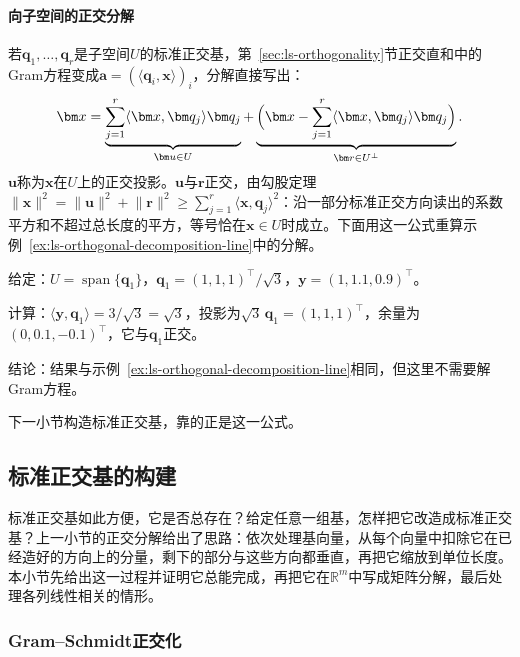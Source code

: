 \paragraph{向子空间的正交分解}
若$\bm q_1,\ldots,\bm q_r$是子空间$U$的标准正交基，第~\ref{sec:ls-orthogonality}节正交直和中的Gram方程变成$\bm a=(\langle\bm q_i,\bm x\rangle)_i$，分解直接写出：
\begin{equation}
 \bm x=\underbrace{\sum_{j=1}^r\langle\bm x,\bm q_j\rangle\bm q_j}_{\bm u\in U}+\underbrace{\Bigl(\bm x-\sum_{j=1}^r\langle\bm x,\bm q_j\rangle\bm q_j\Bigr)}_{\bm r\in U^\perp}.
 \label{eq:ls-orthonormal-projection}
\end{equation}
$\bm u$称为$\bm x$在$U$上的正交投影。$\bm u$与$\bm r$正交，由勾股定理$\lVert\bm x\rVert^2=\lVert\bm u\rVert^2+\lVert\bm r\rVert^2\geq\sum_{j=1}^r\langle\bm x,\bm q_j\rangle^2$：沿一部分标准正交方向读出的系数平方和不超过总长度的平方，等号恰在$\bm x\in U$时成立。下面用这一公式重算示例~\ref{ex:ls-orthogonal-decomposition-line}中的分解。
\begin{example}[用标准正交基重算正交分解]
\label{ex:ls-orthonormal-projection-line}
给定：$U=\operatorname{span}\{\bm q_1\}$，$\bm q_1=(1,1,1)^\top/\sqrt3$，$\bm y=(1,1.1,0.9)^\top$。

计算：$\langle\bm y,\bm q_1\rangle=3/\sqrt3=\sqrt3$，投影为$\sqrt3\,\bm q_1=(1,1,1)^\top$，余量为$(0,0.1,-0.1)^\top$，它与$\bm q_1$正交。

结论：结果与示例~\ref{ex:ls-orthogonal-decomposition-line}相同，但这里不需要解Gram方程。
\end{example}
下一小节构造标准正交基，靠的正是这一公式。

\subsection{标准正交基的构建}
\label{sec:ls-orthonormal-basis-construction}

标准正交基如此方便，它是否总存在？给定任意一组基，怎样把它改造成标准正交基？上一小节的正交分解给出了思路：依次处理基向量，从每个向量中扣除它在已经造好的方向上的分量，剩下的部分与这些方向都垂直，再把它缩放到单位长度。本小节先给出这一过程并证明它总能完成，再把它在$\mathbb R^m$中写成矩阵分解，最后处理各列线性相关的情形。

\subsubsection{Gram--Schmidt正交化}

